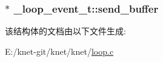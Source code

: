 \subsubsection[{send\+\_\+buffer}]{$\ast$ \+\_\+loop\+\_\+event\+\_\+t\+::send\+\_\+buffer}\label{a00029_a95cfa23b9392db798b8fbcc41f094614_a95cfa23b9392db798b8fbcc41f094614}


该结构体的文档由以下文件生成\+:\begin{DoxyCompactItemize}
\item 
E\+:/knet-\/git/knet/knet/\hyperlink{a00068}{loop.\+c}\end{DoxyCompactItemize}
